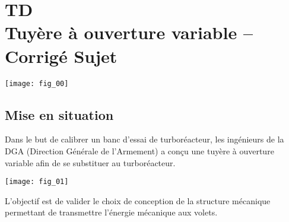 \chapter*{TD  \\ 
Tuyère à ouverture variable -- 
\ifprof Corrigé \else Sujet \fi}

\iflivret {} \else
\ifprof  {} \else \fi
\fi

\setcounter{question}{0}

\begin{marginfigure}[4cm]
\centering
\texttt{[image: fig\_00]}
\end{marginfigure}




\section*{Mise en situation}
Dans le but de calibrer un banc d'essai de turboréacteur, les ingénieurs de la DGA (Direction Générale de l'Armement) a conçu une tuyère à ouverture variable afin de se substituer au turboréacteur. 
\begin{center}
\texttt{[image: fig\_01]}
\end{center}


\begin{obj}
L'objectif est de valider le choix de conception de la structure mécanique permettant
de transmettre l'énergie mécanique aux volets.
\end{obj}

